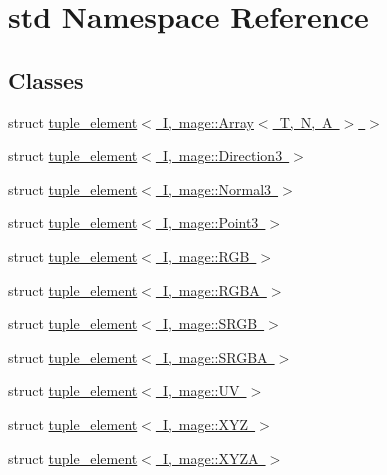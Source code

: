 \hypertarget{namespacestd}{}\section{std Namespace Reference}
\label{namespacestd}
\subsection*{Classes}
\begin{DoxyCompactItemize}
\item 
struct \mbox{\hyperlink{structstd_1_1tuple__element_3_01_i_00_01mage_1_1_array_3_01_t_00_01_n_00_01_a_01_4_01_4}{tuple\+\_\+element$<$ I, mage\+::\+Array$<$ T, N, A $>$ $>$}}
\item 
struct \mbox{\hyperlink{structstd_1_1tuple__element_3_01_i_00_01mage_1_1_direction3_01_4}{tuple\+\_\+element$<$ I, mage\+::\+Direction3 $>$}}
\item 
struct \mbox{\hyperlink{structstd_1_1tuple__element_3_01_i_00_01mage_1_1_normal3_01_4}{tuple\+\_\+element$<$ I, mage\+::\+Normal3 $>$}}
\item 
struct \mbox{\hyperlink{structstd_1_1tuple__element_3_01_i_00_01mage_1_1_point3_01_4}{tuple\+\_\+element$<$ I, mage\+::\+Point3 $>$}}
\item 
struct \mbox{\hyperlink{structstd_1_1tuple__element_3_01_i_00_01mage_1_1_r_g_b_01_4}{tuple\+\_\+element$<$ I, mage\+::\+R\+G\+B $>$}}
\item 
struct \mbox{\hyperlink{structstd_1_1tuple__element_3_01_i_00_01mage_1_1_r_g_b_a_01_4}{tuple\+\_\+element$<$ I, mage\+::\+R\+G\+B\+A $>$}}
\item 
struct \mbox{\hyperlink{structstd_1_1tuple__element_3_01_i_00_01mage_1_1_s_r_g_b_01_4}{tuple\+\_\+element$<$ I, mage\+::\+S\+R\+G\+B $>$}}
\item 
struct \mbox{\hyperlink{structstd_1_1tuple__element_3_01_i_00_01mage_1_1_s_r_g_b_a_01_4}{tuple\+\_\+element$<$ I, mage\+::\+S\+R\+G\+B\+A $>$}}
\item 
struct \mbox{\hyperlink{structstd_1_1tuple__element_3_01_i_00_01mage_1_1_u_v_01_4}{tuple\+\_\+element$<$ I, mage\+::\+U\+V $>$}}
\item 
struct \mbox{\hyperlink{structstd_1_1tuple__element_3_01_i_00_01mage_1_1_x_y_z_01_4}{tuple\+\_\+element$<$ I, mage\+::\+X\+Y\+Z $>$}}
\item 
struct \mbox{\hyperlink{structstd_1_1tuple__element_3_01_i_00_01mage_1_1_x_y_z_a_01_4}{tuple\+\_\+element$<$ I, mage\+::\+X\+Y\+Z\+A $>$}}
\item 

\end{DoxyCompactItemize}
